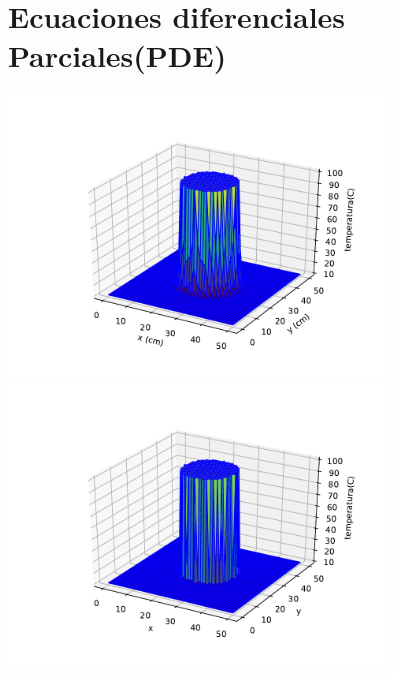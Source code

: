 \documentclass[12pt]{article}
\begin{document}
\section{Ecuaciones diferenciales Parciales(PDE)}
\begin{centering}
\includegraphics[width=0.75\textwidth]{3d2.pdf}
\\
\includegraphics[width=0.75\textwidth]{3d3.pdf}
\end{centering}

 
\end{document}
